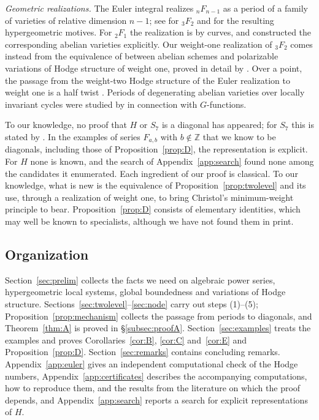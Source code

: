 \documentclass[11pt]{amsart}
\theoremstyle{definition}
\theoremstyle{remark}
\numberwithin{equation}{section}
\newcommand{\Z}{\mathbb{Z}}
\newcommand{\Fab}{F_{a,b}}
\begin{document}
\emph{Geometric realizations.} The Euler integral realizes ${}_nF_{n-1}$ as a period of a family of varieties of relative dimension $n-1$; see \citet[\S4.3]{Christol2015} for ${}_3F_2$ and \citet{KellyVoight2024} for the resulting hypergeometric motives. For ${}_2F_1$ the realization is by curves, and \citet{Archinard2003} constructed the corresponding abelian varieties explicitly. Our weight-one realization of ${}_3F_2$ comes instead from the equivalence of \citet[4.4.3]{Deligne1971} between abelian schemes and polarizable variations of Hodge structure of weight one, proved in detail by \citet[Theorem~7.13]{Milne2013}. Over a point, the passage from the weight-two Hodge structure of the Euler realization to weight one is a half twist \citep{vanGeemen2001,vanGeemenIzadi2002}. Periods of degenerating abelian varieties over locally invariant cycles were studied by \citet{Andre1989} in connection with $G$-functions.

To our knowledge, no proof that $H$ or $S_7$ is a diagonal has appeared; for $S_7$ this is stated by \citet[Remark~4.2]{HarderKramerMiller2026}. In the examples of series $\Fab$ with $b\notin\Z$ that we know to be diagonals, including those of Proposition~\ref{prop:D}, the representation is explicit. For $H$ none is known, and the search of Appendix~\ref{app:search} found none among the candidates it enumerated. Each ingredient of our proof is classical. To our knowledge, what is new is the equivalence of Proposition~\ref{prop:twolevel} and its use, through a realization of weight one, to bring Christol's minimum-weight principle to bear. Proposition~\ref{prop:D} consists of elementary identities, which may well be known to specialists, although we have not found them in print.

\subsection{Organization}
Section~\ref{sec:prelim} collects the facts we need on algebraic power series, hypergeometric local systems, global boundedness and variations of Hodge structure. Sections~\ref{sec:twolevel}--\ref{sec:node} carry out steps (1)--(5); Proposition~\ref{prop:mechanism} collects the passage from periods to diagonals, and Theorem~\ref{thm:A} is proved in \S\ref{subsec:proofA}. Section~\ref{sec:examples} treats the examples and proves Corollaries~\ref{cor:B}, \ref{cor:C} and~\ref{cor:E} and Proposition~\ref{prop:D}. Section~\ref{sec:remarks} contains concluding remarks. Appendix~\ref{app:euler} gives an independent computational check of the Hodge numbers, Appendix~\ref{app:certificates} describes the accompanying computations, how to reproduce them, and the results from the literature on which the proof depends, and Appendix~\ref{app:search} reports a search for explicit representations of $H$.
\end{document}

